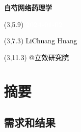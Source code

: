 \documentclass[
]{article}
\author{}
\date{\vspace{-2.5em}}
\begin{document}
\begin{titlepage} 
\begin{center} \textbf{\Huge 白芍网络药理学}
\vspace{4em} \begin{textblock}{10}(3,5.9) \huge
\textbf{\textcolor{white}{2024-01-02}}
\end{textblock} \begin{textblock}{10}(3,7.3)
\Large \textcolor{black}{LiChuang Huang}
\end{textblock} \begin{textblock}{10}(3,11.3)
\Large \textcolor{black}{@立效研究院}
\end{textblock} \end{center} \end{titlepage}
\restoregeometry


\tableofcontents

\listoffigures

\listoftables

\newpage


\hypertarget{abstract}{%
\section{摘要}\label{abstract}}

\hypertarget{ux9700ux6c42ux548cux7ed3ux679c}{%
\subsection{需求和结果}\label{ux9700ux6c42ux548cux7ed3ux679c}}
\end{document}
